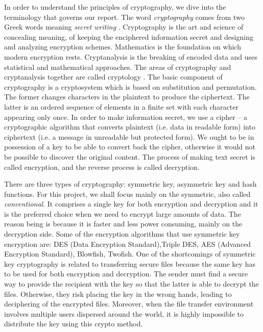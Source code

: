 In order to understand the principles of cryptography, we dive into the terminology that governs our report. The word \emph{cryptography} comes from two Greek words meaning \emph{secret writing} \cite{wikicrypto}. Cryptography is the art and science of concealing meaning, of keeping the enciphered information secret and designing and analyzing encryption schemes. Mathematics is the foundation on which modern encryption rests. Cryptanalysis is the breaking of encoded data and uses statistical and mathematical approaches. The areas of cryptography and cryptanalysis together are called cryptology \cite{wikicrypto}. The basic component of cryptography is a cryptosystem which is based on substitution and permutation. The former changes characters in the plaintext to produce the ciphertext. The latter is an ordered sequence of elements in a finite set with each character appearing only once. In order to make information secret, we use a cipher – a cryptographic algorithm that converts plaintext (i.e. data in readable form) into ciphertext (i.e. a message in unreadable but protected form). We ought to be in possession of a key to be able to convert back the cipher, otherwise it would not be possible to discover the original content. The process of making text secret is called encryption, and the reverse process is called decryption.

There are three types of cryptography: symmetric key, asymmetric key and hash functions. For this project, we shall focus mainly on the symmetric, also called \emph{conventional}. It comprises a single key for both encryption and decryption and it is the preferred choice when we need to encrypt large amounts of data. The reason being is because it is faster and less power consuming, mainly on the decryption side. Some of the encryption algorithms that use symmetric key encryption are: DES (Data Encryption Standard),Triple DES, AES (Advanced Encryption Standard), Blowfish, Twofish. One of the shortcomings of symmetric key cryptography is related to transferring secure files because the same key has to be used for both encryption and decryption. The sender must find a secure way to provide the recipient with the key so that the latter is able to decrypt the files. Otherwise, they risk placing the key in the wrong hands, leading to deciphering of the encrypted files. Moreover, when the file transfer environment involves multiple users dispersed around the world, it is highly impossible to distribute the key using this crypto method. 

